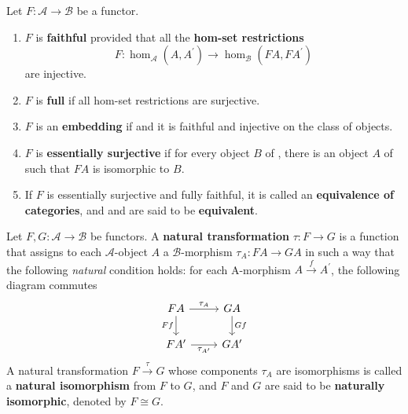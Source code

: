 
Let $F: \mathcal{A} \rightarrow \mathcal{B}$ be a functor.
\begin{enumerate}
    \item $F$ is \textbf{faithful} provided that all the \textbf{hom-set restrictions}
    $$
    F: \operatorname{hom}_{\mathcal{A}}\left(A, A^{\prime}\right) \rightarrow \operatorname{hom}_{\mathcal{B}}\left(F A, F A^{\prime}\right)
    $$
    are injective.
    \item $F$ is \textbf{full} if all hom-set restrictions are surjective.
    \item $F$ is an \textbf{embedding} if and it is faithful and injective on the class of objects.
    \item $F$ is \textbf{essentially surjective} if for every object $B$ of \cb, there is an object $A$ of \ca such that $F A$ is isomorphic to $B$. 
    \item If $F$ is essentially surjective and fully faithful, it is called an \textbf{equivalence of categories}, and \ca and \cb are said to be \textbf{equivalent}.
\end{enumerate}

Let $F, G: \mathcal{A} \rightarrow \mathcal{B}$ be functors. A \textbf{natural transformation} $\tau: F \rightarrow G$ is a function that assigns to each $\mathcal{A}$-object $A$ a $\mathcal{B}$-morphism $\tau_A: F A \rightarrow G A$ in such a way that the following \textit{natural} condition holds: for each A-morphism $A \xrightarrow{f} A^{\prime}$, the following diagram commutes
$$
\begin{tikzcd}
FA \arrow[r, "\tau_A"] \arrow[d, "Ff"'] & GA \arrow[d, "Gf"] \\
FA' \arrow[r, "\tau_{A'}"'] & GA'
\end{tikzcd}
$$
A natural transformation $F \xrightarrow{\tau} G$ whose components $\tau_A$ are isomorphisms is called a \textbf{natural isomorphism} from $F$ to $G$, and $F$ and $G$ are said to be \textbf{naturally isomorphic}, denoted by $F \cong G$.

